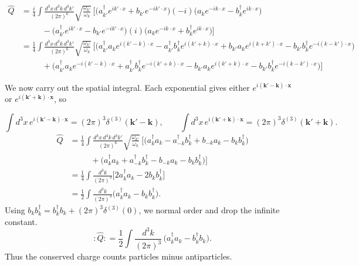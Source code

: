 \documentclass[12pt]{article}
\newcommand{\+}{\dagger}
\begin{document}
\begin{align*}
\hat{Q}
  &= \frac{i}{4} \!\int\! \frac{d^3x\, d^3k\, d^3k'}{(2\pi)^6}
     \sqrt{\frac{\omega_{k'}}{\omega_k}}\,
     \Big[
       \big(a_{k'}^{\dagger} e^{ik'\cdot x} + b_{k'} e^{-ik'\cdot x}\big)
       (-i)\big(a_k e^{-ik\cdot x} - b_k^{\dagger} e^{ik\cdot x}\big)
\\[-0.5em]
  &\quad\quad\;\;
       -\big(a_{k'}^{\dagger} e^{ik'\cdot x} - b_{k'} e^{-ik'\cdot x}\big)
       (i)\big(a_k e^{-ik\cdot x} + b_k^{\dagger} e^{ik\cdot x}\big)
     \Big] \\
  &= \frac{1}{4} \!\int\! \frac{d^3x\, d^3k\, d^3k'}{(2\pi)^6}
     \sqrt{\frac{\omega_{k'}}{\omega_k}}\,
     \Big[
     \big(a^{\dagger}_{k'}a_ke^{i(k' - k)\cdot x} -
         a^{\dagger}_{k'}b^{\dagger}_{k} e^{i(k' + k)\cdot x} + b_{k'}a_k
         e^{i(k + k')\cdot x} - b_{k'}b^{\dagger}_k e^{-i(k - k')\cdot x} \big)
\\[-0.5em]
  &\quad\quad\;\;
       + \big(a^{\dagger}_{k'}a_ke^{-i(k' - k)\cdot x} +
         a^{\dagger}_{k'}b^{\dagger}_{k} e^{-i(k' + k)\cdot x} - b_{k'}a_k
         e^{i(k' + k)\cdot x} - b_{k'}b^{\dagger}_k e^{-i(k - k')\cdot x} \big)
     \Big]
\end{align*}

We now carry out the spatial integral. Each exponential gives either 
$e^{i(\mathbf{k}'-\mathbf{k})\cdot\mathbf{x}}$ or 
$e^{i(\mathbf{k}'+\mathbf{k})\cdot\mathbf{x}}$, so

\[
\int d^3x\, e^{i(\mathbf{k}'-\mathbf{k})\cdot\mathbf{x}} = (2\pi)^3\delta^{(3)}(\mathbf{k}'-\mathbf{k}),
\qquad
\int d^3x\, e^{i(\mathbf{k}'+\mathbf{k})\cdot\mathbf{x}} = (2\pi)^3\delta^{(3)}(\mathbf{k}'+\mathbf{k}).
\]
\begin{align*}
\hat{Q}
  &= \frac{1}{4} \!\int\! \frac{d^3x\, d^3k\, d^3k'}{(2\pi)^6}
     \sqrt{\frac{\omega_{k'}}{\omega_k}}\,
     \Big[
     \big(a^{\dagger}_{k}a_k - a^{\dagger}_{-k}b^{\dagger}_{k} + b_{-k}a_k -
     b_{k}b^{\dagger}_k \big)
\\[-0.5em]
  &\quad\quad\;\;
       + \big(a^{\dagger}_{k}a_k + a^{\dagger}_{-k}b^{\dagger}_{k} - b_{-k}a_k
       - b_{k}b^{\dagger}_k  \big)
     \Big] \\
&= \frac{1}{4}\!\int\!\frac{d^3k}{(2\pi)^3}
\Big[
    2a_{k}^{\dagger} a_k  - 2b_kb^{\dagger}_k
\Big] \\
&= \frac{1}{2}\!\int\!\frac{d^3k}{(2\pi)^3}
\Big(
    a_{k}^{\dagger} a_k  - b_kb^{\dagger}_k
\Big).
\end{align*}
Using $b_k b_k^{\dagger} = b_k^{\dagger}b_k + (2\pi)^3\delta^{(3)}(0)$, we
normal order and drop the infinite constant.
\[
:\hat{Q}: = \frac{1}{2} \int\!\frac{d^3k}{(2\pi)^3}\,
\big(a_k^{\dagger}a_k - b_k^{\dagger}b_k\big).
\]
Thus the conserved charge counts particles minus antiparticles.
\end{document}
